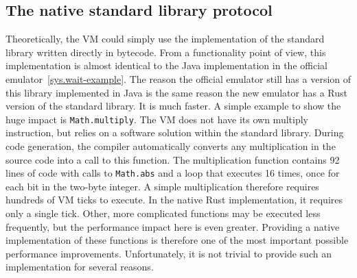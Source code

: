 \subsection{The native standard library protocol} \label{jack-stdlib-in-rust}
Theoretically, the VM could simply use the implementation of the standard library written directly in bytecode.
From a functionality point of view, this implementation is almost identical to the Java implementation in the official emulator~\ref{sys.wait-example}.
The reason the official emulator still has a version of this library implemented in Java is the same reason the new emulator has a Rust version of the standard library.
It is much faster.
A simple example to show the huge impact is \verb+Math.multiply+.
The VM does not have its own multiply instruction, but relies on a software solution within the standard library.
During code generation, the compiler automatically converts any multiplication in the source code into a call to this function.
The multiplication function contains 92 lines of code with calls to \verb+Math.abs+ and a loop that executes 16 times, once for each bit in the two-byte integer.
A simple multiplication therefore requires hundreds of VM ticks to execute.
In the native Rust implementation, it requires only a single tick.
Other, more complicated functions may be executed less frequently, but the performance impact here is even greater.
Providing a native implementation of these functions is therefore one of the most important possible performance improvements.
Unfortunately, it is not trivial to provide such an implementation for several reasons.

